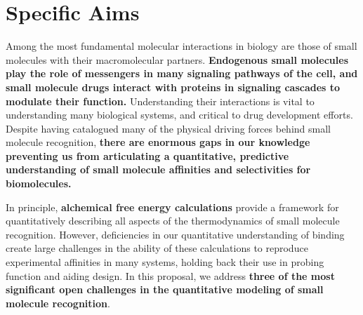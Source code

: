 \documentclass[10pt,final]{article}
\date{}
\begin{document}
\newpage
\section*{\centering Specific Aims}
Among the most fundamental molecular interactions in biology are those of small molecules with their macromolecular partners.
\textbf{Endogenous small molecules play the role of messengers in many signaling pathways of the cell, and small molecule drugs interact with proteins in signaling cascades to modulate their function.}
Understanding their interactions is vital to understanding many biological systems, and critical to drug development efforts.
Despite having catalogued many of the physical driving forces behind small molecule recognition, \textbf{there are enormous gaps in our knowledge preventing us from articulating a quantitative, predictive understanding of small molecule affinities and selectivities for biomolecules.}

In principle, \textbf{alchemical free energy calculations} provide a framework for quantitatively describing all aspects of the thermodynamics of small molecule recognition. However, deficiencies in our quantitative understanding of binding create large challenges in the ability of these calculations to reproduce experimental affinities in many systems, holding back their use in probing function and aiding design.
In this proposal, we address \textbf{three of the most significant open challenges in the quantitative modeling of small molecule recognition}.
\end{document}

